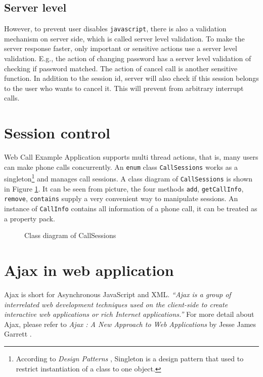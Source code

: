 \subsection{Server level}
\label{sec:WebApplication:ValidationMechanism:ServerLevel}

However, to prevent user disables \texttt{javascript}, there is also a validation mechanism on server side, which is called server level validation. To make the server response faster, only important or sensitive actions use a server level validation. E.g., the action of changing password has a server level validation of checking if password matched. The action of cancel call is another sensitive function. In addition to the session id, server will also check if this session belongs to the user who wants to cancel it. This will prevent from arbitrary interrupt calls.

\section{Session control}
\label{sec:WebApplication:SessionControl}

Web Call Example Application supports multi thread actions, that is, many users can make phone calls concurrently. An \texttt{enum} class \texttt{CallSessions} works as a singleton\footnote{According to \textit{Design Patterns} \cite{DesignPatternGoF}, Singleton is a design pattern that used to restrict instantiation of a class to one object.} and manages call sessions. A class diagram of \texttt{CallSessions} is shown in Figure \ref{fig:ClassDiagramOfCallSessions}. It can be seen from picture, the four methods \texttt{add}, \texttt{getCallInfo}, \texttt{remove}, \texttt{contains} supply a very convenient way to manipulate sessions. An instance of \texttt{CallInfo} contains all information of a phone call, it can be treated as a property pack.

\begin{figure}[!hbtp]
\centering
{}
\caption{Class diagram of CallSessions}
\label{fig:ClassDiagramOfCallSessions}
\end{figure} 

\section{Ajax in web application}
\label{sec:WebApplication:AjaxInWebApplication}

Ajax\label{sym:Ajax} is short for Asynchronous JavaScript and XML. \textit{``Ajax is a group of interrelated web development techniques used on the client-side to create interactive web applications or rich Internet applications.''} \cite{AjaxAtWiki} For more detail about Ajax, please refer to \textit{Ajax : A New Approach to Web Applications} by Jesse James Garrett \cite{AjaxJesse}.

